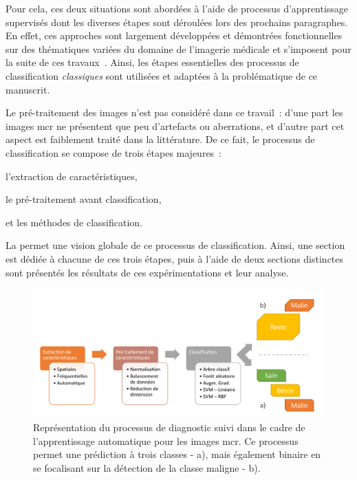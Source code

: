 Pour cela, ces deux situations sont abordées à l'aide de processus d'apprentissage supervisés dont les diverses étapes sont déroulées lors des prochains paragraphes. En effet, ces approches sont largement développées et démontrées fonctionnelles sur des thématiques variées du domaine de l'imagerie médicale et s'imposent pour la suite de ces travaux~\cite{Litjens2017,Pathan2018}. Ainsi, les étapes essentielles des processus de classification \textit{classiques} sont utilisées et adaptées à la problématique de ce manuscrit.\par

Le pré-traitement des images n'est pas considéré dans ce travail~: d'une part les images \gls{mcr} ne présentent que peu d'artefacts ou aberrations, et d'autre part cet aspect est faiblement traité dans la littérature. De ce fait, le processus de classification se compose de trois étapes majeures~:
\begin{inlinerate}
    \item l'extraction de caractéristiques,
    \item le pré-traitement avant classification,
    \item et les méthodes de classification.
\end{inlinerate} La  permet une vision globale de ce processus de classification. Ainsi, une section est dédiée à chacune de ces trois étapes, puis à l'aide de deux sections distinctes sont présentés les résultats de ces expérimentations et leur analyse.\par

\begin{figure}[H]
\centering
    \includegraphics[width=\linewidth]{contents/chapter_5/resources/scheme_macro_image_classification.pdf}
    \caption{Représentation du processus de diagnostic suivi dans le cadre de l'apprentissage automatique pour les images \gls{mcr}. Ce processus permet une prédiction à trois classes - a), mais également binaire en se focalisant sur la détection de la classe maligne - b).}
    \label{fig:scheme_macro_image_classification}
\end{figure}\par

